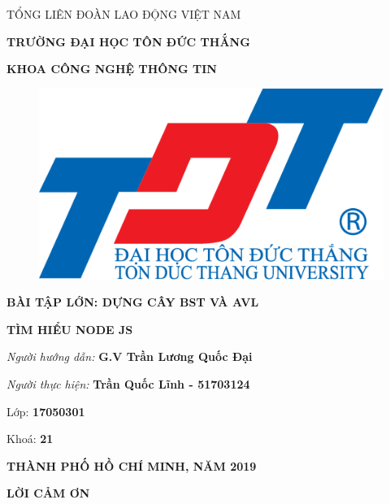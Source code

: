 \documentclass{report}
\begin{document}
\newpage
\changefontsizes[14pt]{12pt}
\centerline{TỔNG LIÊN ĐOÀN LAO ĐỘNG VIỆT NAM}

\changefontsizes[14pt]{11pt}
\centerline{\textbf{TRƯỜNG ĐẠI HỌC TÔN ĐỨC THẮNG}}
\centerline{\textbf{KHOA CÔNG NGHỆ THÔNG TIN}}

\begin{center}
    \begin{figure}[htp]
    \begin{center}
     \includegraphics[scale=.2]{logo}
    \end{center}
    \end{figure}
\end{center}

\changefontsizes{16pt}
\centerline{\textbf{BÀI TẬP LỚN: DỰNG CÂY BST VÀ AVL}}
\vspace{1.5cm}
\changefontsizes{24pt}
\centerline{\textbf{TÌM HIỂU NODE JS}}

\vspace{4cm}
\begin{flushright}
\renewcommand{\baselinestretch}{0.05}
\changefontsizes{14pt}
\textit{Người hướng dẫn: }\textbf{G.V Trần Lương Quốc Đại}
\setlength{\parskip}{0.5em}

\textit{Người thực hiện: }\textbf{Trần Quốc Lĩnh - 51703124}
\setlength{\parskip}{0.5em}

Lớp: \textbf{17050301}
\setlength{\parskip}{0.5em}

Khoá: \textbf{21}
\setlength{\parskip}{0.5em}

\end{flushright}

\vspace{1cm}
\changefontsizes{14pt}
\centerline{\textbf{THÀNH PHỐ HỒ CHÍ MINH, NĂM 2019}}


\newpage
\changefontsizes{16pt}
\centerline{\textbf{LỜI CẢM ƠN}}
\end{document}

